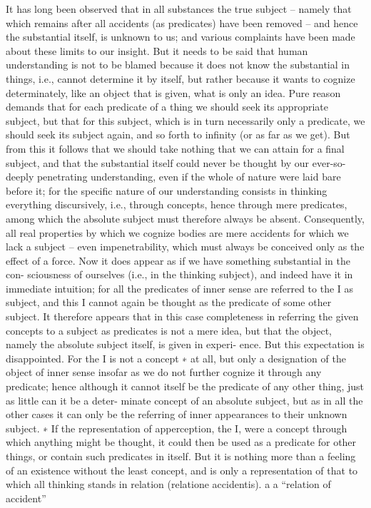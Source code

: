 It has long been observed that in all substances the true subject – namely
that which remains after all accidents (as predicates) have been removed –
and hence the substantial itself, is unknown to us; and various complaints
have been made about these limits to our insight. But it needs to be said
that human understanding is not to be blamed because it does not know
the substantial in things, i.e., cannot determine it by itself, but rather
because it wants to cognize determinately, like an object that is given,
what is only an idea. Pure reason demands that for each predicate of a
thing we should seek its appropriate subject, but that for this subject,
which is in turn necessarily only a predicate, we should seek its subject
again, and so forth to inﬁnity (or as far as we get). But from this it
follows that we should take nothing that we can attain for a ﬁnal subject,
and that the substantial itself could never be thought by our ever-so-
deeply penetrating understanding, even if the whole of nature were laid
bare before it; for the speciﬁc nature of our understanding consists in
thinking everything discursively, i.e., through concepts, hence through
mere predicates, among which the absolute subject must therefore always
be absent. Consequently, all real properties by which we cognize bodies
are mere accidents for which we lack a subject – even impenetrability,
which must always be conceived only as the effect of a force.
Now it does appear as if we have something substantial in the con-
sciousness of ourselves (i.e., in the thinking subject), and indeed have it
in immediate intuition; for all the predicates of inner sense are referred
to the I as subject, and this I cannot again be thought as the predicate of
some other subject. It therefore appears that in this case completeness in
referring the given concepts to a subject as predicates is not a mere idea,
but that the object, namely the absolute subject itself, is given in experi-
ence. But this expectation is disappointed. For the I is not a concept ∗ at
all, but only a designation of the object of inner sense insofar as we do
not further cognize it through any predicate; hence although it cannot
itself be the predicate of any other thing, just as little can it be a deter-
minate concept of an absolute subject, but as in all the other cases it can
only be the referring of inner appearances to their unknown subject.
∗ If the representation of apperception, the I, were a concept through which
anything might be thought, it could then be used as a predicate for other
things, or contain such predicates in itself. But it is nothing more than a feeling
of an existence without the least concept, and is only a representation of that
to which all thinking stands in relation (relatione accidentis). a
a “relation of accident”

